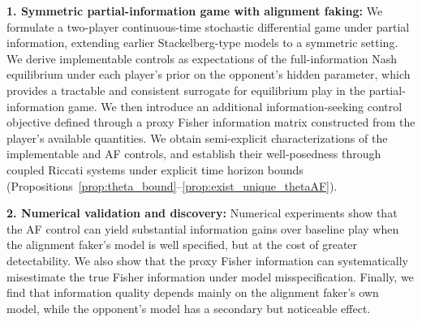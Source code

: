 \documentclass[letterpaper, 10 pt, conference]{ieeeconf}
\begin{document}


\noindent \textbf{1. Symmetric partial-information game with alignment faking:} We formulate a two-player continuous-time stochastic differential game under partial information, extending earlier Stackelberg-type models \cite{hu2025strategic} to a symmetric setting. We derive implementable controls as expectations of the full-information Nash equilibrium under each player's prior on the opponent's hidden parameter, which provides a tractable and consistent surrogate for equilibrium play in the partial-information game.  We then introduce an additional information-seeking control objective defined through a proxy Fisher information matrix constructed from the player's available quantities. We obtain semi-explicit characterizations of the implementable and AF controls, and establish their well-posedness through coupled Riccati systems under explicit time horizon bounds (Propositions~\ref{prop:theta_bound}--\ref{prop:exist_unique_thetaAF}).


\noindent\textbf{2. Numerical validation and discovery:} Numerical experiments show that the AF control can yield substantial information gains over baseline play when the alignment faker's model is well specified, but at the cost of greater detectability. We also show that the proxy Fisher information can systematically misestimate the true Fisher information under model misspecification. Finally, we find that information quality depends mainly on the alignment faker's own model, while the opponent's model has a secondary but noticeable effect.

\end{document}

